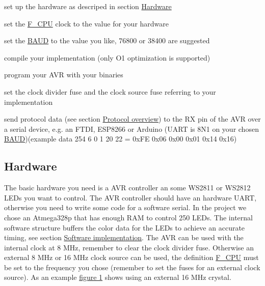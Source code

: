 \begin{DoxyItemize}
\item set up the hardware as descriped in section \hyperlink{index_hardware_sec}{Hardware} 
\item set the \hyperlink{globals_8h_a43bafb28b29491ec7f871319b5a3b2f8}{F\+\_\+\+C\+P\+U} clock to the value for your hardware 
\item set the \hyperlink{ws2811lichterkette_8c_a62634036639f88eece6fbf226b45f84b}{B\+A\+U\+D} to the value you like, 76800 or 38400 are suggested 
\item compile your implementation (only O1 optimization is supported) 
\item program your A\+V\+R with your binaries 
\item set the clock divider fuse and the clock source fuse referring to your implementation 
\item send protocol data (see section \hyperlink{index_protocol_sec}{Protocol overview}) to the R\+X pin of the A\+V\+R over a serial device, e.\+g. an F\+T\+D\+I, E\+S\+P8266 or Arduino (U\+A\+R\+T is 8\+N1 on your chosen \hyperlink{ws2811lichterkette_8c_a62634036639f88eece6fbf226b45f84b}{B\+A\+U\+D})(example data 254 6 0 1 20 22 = 0x\+F\+E 0x06 0x00 0x01 0x14 0x16) 
\end{DoxyItemize}\hypertarget{index_hardware_sec}{}\subsection{Hardware}\label{index_hardware_sec}
The basic hardware you need is a A\+V\+R controller an some W\+S2811 or W\+S2812 L\+E\+Ds you want to control. The A\+V\+R controller should have an hardware U\+A\+R\+T, otherwise you need to write some code for a software serial. In the project we chose an Atmega328p that has enough R\+A\+M to control 250 L\+E\+Ds. The internal software structure buffers the color data for the L\+E\+Ds to achieve an accurate timing, see section \hyperlink{index_software_sec}{Software implementation}. The A\+V\+R can be used with the internal clock at 8 M\+Hz, remember to clear the clock divider fuse. Otherwise an external 8 M\+Hz or 16 M\+Hz clock source can be used, the definition \hyperlink{globals_8h_a43bafb28b29491ec7f871319b5a3b2f8}{F\+\_\+\+C\+P\+U} must be set to the frequency you chose (remember to set the fuses for an external clock source). As an example \hyperlink{index_one}{figure 1} shows using an external 16 M\+Hz crystal. \label{index_one}%
\hypertarget{index_one}{}%
  
